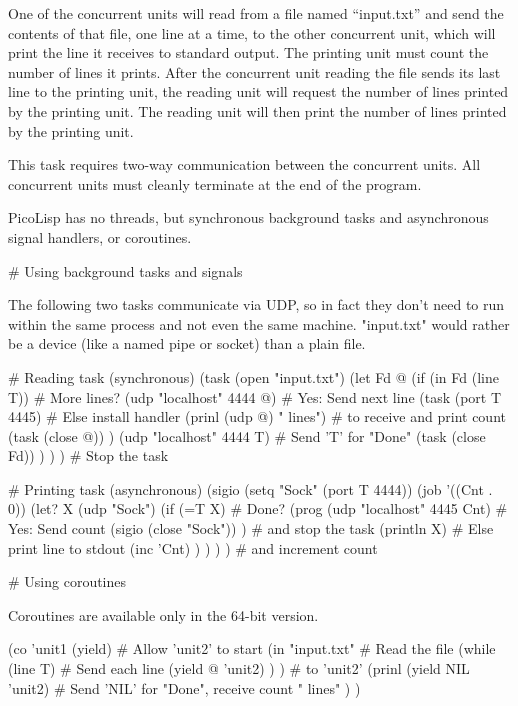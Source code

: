 \begin{itemize}
One of the concurrent units will read from a file named ``input.txt''
and send the contents of that file, one line at a time, to the other
concurrent unit, which will print the line it receives to standard
output. The printing unit must count the number of lines it prints.
After the concurrent unit reading the file sends its last line to the
printing unit, the reading unit will request the number of lines printed
by the printing unit. The reading unit will then print the number of
lines printed by the printing unit.

This task requires two-way communication between the concurrent units.
All concurrent units must cleanly terminate at the end of the program.


\begin{wideverbatim}

PicoLisp has no threads, but synchronous background tasks and asynchronous
signal handlers, or coroutines.

# Using background tasks and signals

The following two tasks communicate via UDP, so in fact they don't need to run
within the same process and not even the same machine. "input.txt" would rather
be a device (like a named pipe or socket) than a plain file.

# Reading task (synchronous)
(task (open "input.txt")
   (let Fd @
      (if (in Fd (line T))             # More lines?
         (udp "localhost" 4444 @)      # Yes: Send next line
         (task (port T 4445)           # Else install handler
            (prinl (udp @) " lines")   # to receive and print count
            (task (close @)) )
         (udp "localhost" 4444 T)      # Send 'T' for "Done"
         (task (close Fd)) ) ) )       # Stop the task

# Printing task (asynchronous)
(sigio (setq "Sock" (port T 4444))
   (job '((Cnt . 0))
      (let? X (udp "Sock")
         (if (=T X)                    # Done?
            (prog
               (udp "localhost" 4445 Cnt) # Yes: Send count
               (sigio (close "Sock")) )   # and stop the task
            (println X)                # Else print line to stdout
            (inc 'Cnt) ) ) ) )         # and increment count

# Using coroutines

Coroutines are available only in the 64-bit version.

(co 'unit1
   (yield)                       # Allow 'unit2' to start
   (in "input.txt"               # Read the file
      (while (line T)            # Send each line
         (yield @ 'unit2) ) )    # to 'unit2'
   (prinl
      (yield NIL 'unit2)         # Send 'NIL' for "Done", receive count
      " lines" ) )


\end{wideverbatim}
\end{itemize}
